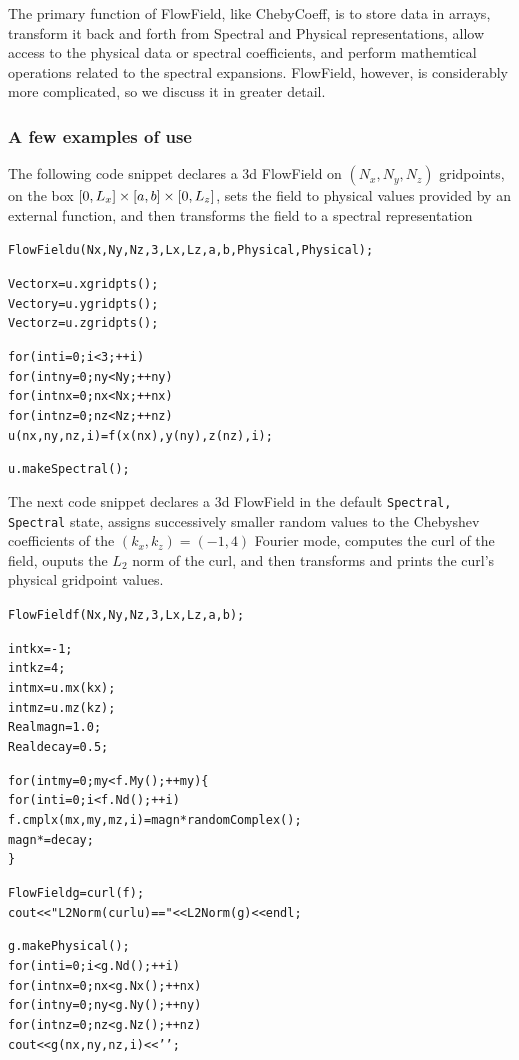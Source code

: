 \documentclass{article}[12pt]
\begin{document}
The primary function of FlowField, like ChebyCoeff, is to store data
in arrays, transform it back and forth from Spectral and Physical
representations, allow access to the physical data or spectral
coefficients, and perform mathemtical operations related to the
spectral expansions. FlowField, however, is considerably more
complicated, so we discuss it in greater detail.


\subsubsection{A few examples of use}

The following code snippet declares a 3d FlowField on $(N_x, N_y, N_z)$
gridpoints, on the box $[0, L_x] \times [a, b] \times [0, L_z]$, sets
the field to physical values provided by an external function, and then
transforms the field to a spectral representation

\begin{alltt}
  FlowField u(Nx,Ny,Nz,3,Lx,Lz,a,b,Physical,Physical);

  Vector x = u.xgridpts();
  Vector y = u.ygridpts();
  Vector z = u.zgridpts();

  for (int i=0; i<3; ++i)
    for (int ny=0; ny<Ny; ++ny)
      for (int nx=0; nx<Nx; ++nx)
        for (int nz=0; nz<Nz; ++nz)
          u(nx,ny,nz,i) = f(x(nx), y(ny), z(nz), i);

  u.makeSpectral();
\end{alltt}

The next code snippet declares a 3d FlowField in the default
{\tt Spectral, Spectral} state, assigns successively smaller random
values to the Chebyshev coefficients of the $(k_x , k_z)
= (-1, 4)$ Fourier mode, computes the curl of the field, ouputs the
$L_2$ norm of the curl, and then transforms and prints the curl's
physical gridpoint values.

\begin{alltt}
  FlowField f(Nx,Ny,Nz,3,Lx,Lz,a,b);

  int kx = -1;
  int kz =  4;
  int mx = u.mx(kx);
  int mz = u.mz(kz);
  Real magn = 1.0;
  Real decay = 0.5;

  for (int my=0; my<f.My(); ++my) \{
    for (int i=0; i<f.Nd(); ++i)
      f.cmplx(mx,my,mz,i) = magn*randomComplex();
    magn *= decay;
  \}

  FlowField g = curl(f);
  cout << "L2Norm(curl u) == " << L2Norm(g) << endl;

  g.makePhysical();
  for (int i=0; i<g.Nd(); ++i)
    for (int nx=0; nx<g.Nx(); ++nx)
      for (int ny=0; ny<g.Ny(); ++ny)
        for (int nz=0; nz<g.Nz(); ++nz)
          cout << g(nx,ny,nz,i) << ' ';

\end{alltt}
\end{document}
